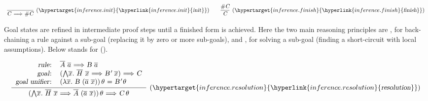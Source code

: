 \begin{isabellebody}
\begin{isamarkuptext}
  \[
  \begin{array}{c@ {\qquad}c}
  \infer[(\indexdef{}{inference}{init}\hypertarget{inference.init}{\hyperlink{inference.init}{\mbox{\isa{init}}}})]{\isa{{\isachardoublequote}C\ {\isasymLongrightarrow}\ {\isacharhash}C{\isachardoublequote}}}{} &
  \infer[(\indexdef{}{inference}{finish}\hypertarget{inference.finish}{\hyperlink{inference.finish}{\mbox{\isa{finish}}}})]{\isa{C}}{\isa{{\isachardoublequote}{\isacharhash}C{\isachardoublequote}}}
  \end{array}
  \]

  Goal states are refined in intermediate proof steps until a finished
  form is achieved.  Here the two main reasoning principles are
  \hyperlink{inference.resolution}{\mbox{}}, for back-chaining a rule against a sub-goal
  (replacing it by zero or more sub-goals), and \hyperlink{inference.assumption}{\mbox{}}, for solving a sub-goal (finding a short-circuit with
  local assumptions).  Below  stands for  ().

  \[
  \infer[(\indexdef{}{inference}{resolution}\hypertarget{inference.resolution}{\hyperlink{inference.resolution}{\mbox{\isa{resolution}}}})]
  {\isa{{\isachardoublequote}{\isacharparenleft}{\isasymAnd}\isactrlvec x{\isachardot}\ \isactrlvec H\ \isactrlvec x\ {\isasymLongrightarrow}\ \isactrlvec A\ {\isacharparenleft}\isactrlvec a\ \isactrlvec x{\isacharparenright}{\isacharparenright}{\isasymvartheta}\ {\isasymLongrightarrow}\ C{\isasymvartheta}{\isachardoublequote}}}
  {\begin{tabular}{rl}
    \isa{{\isachardoublequote}rule{\isacharcolon}{\isachardoublequote}} &
    \isa{{\isachardoublequote}\isactrlvec A\ \isactrlvec a\ {\isasymLongrightarrow}\ B\ \isactrlvec a{\isachardoublequote}} \\
    \isa{{\isachardoublequote}goal{\isacharcolon}{\isachardoublequote}} &
    \isa{{\isachardoublequote}{\isacharparenleft}{\isasymAnd}\isactrlvec x{\isachardot}\ \isactrlvec H\ \isactrlvec x\ {\isasymLongrightarrow}\ B{\isacharprime}\ \isactrlvec x{\isacharparenright}\ {\isasymLongrightarrow}\ C{\isachardoublequote}} \\
    \isa{{\isachardoublequote}goal\ unifier{\isacharcolon}{\isachardoublequote}} &
    \isa{{\isachardoublequote}{\isacharparenleft}{\isasymlambda}\isactrlvec x{\isachardot}\ B\ {\isacharparenleft}\isactrlvec a\ \isactrlvec x{\isacharparenright}{\isacharparenright}{\isasymvartheta}\ {\isacharequal}\ B{\isacharprime}{\isasymvartheta}{\isachardoublequote}} \\
   \end{tabular}}
  \]


\end{isamarkuptext}
\end{isabellebody}
